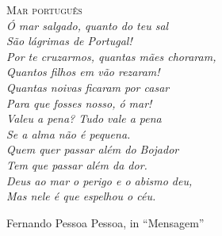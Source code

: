 {\noindent\LARGE\textsc{Mar português}} \\

{ \it
\noindent{}Ó mar salgado, quanto do teu sal \\
São lágrimas de Portugal! \\
Por te cruzarmos, quantas mães choraram, \\
Quantos filhos em vão rezaram! \\
Quantas noivas ficaram por casar \\
Para que fosses nosso, ó mar! \\

\noindent{}Valeu a pena? Tudo vale a pena \\
Se a alma não é pequena. \\
Quem quer passar além do Bojador \\
Tem que passar além da dor. \\
Deus ao mar o perigo e o abismo deu, \\
Mas nele é que espelhou o céu. \\
}

\noindent{}Fernando Pessoa Pessoa, in ``Mensagem''

\thispagestyle{empty}
\clearpage

